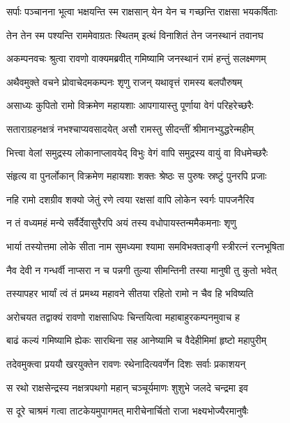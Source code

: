 \twolineshloka
{सर्पाः पञ्चानना भूत्वा भक्षयन्ति स्म राक्षसान्}
{येन येन च गच्छन्ति राक्षसा भयकर्षिताः} %

\twolineshloka
{तेन तेन स्म पश्यन्ति राममेवाग्रतः स्थितम्}
{इत्थं विनाशितं तेन जनस्थानं तवानघ} %

\twolineshloka
{अकम्पनवचः श्रुत्वा रावणो वाक्यमब्रवीत्}
{गमिष्यामि जनस्थानं रामं हन्तुं सलक्ष्मणम्} %

\twolineshloka
{अथैवमुक्ते वचने प्रोवाचेदमकम्पनः}
{शृणु राजन् यथावृत्तं रामस्य बलपौरुषम्} %

\twolineshloka
{असाध्यः कुपितो रामो विक्रमेण महायशाः}
{आपगायास्तु पूर्णाया वेगं परिहरेच्छरैः} %

\twolineshloka
{सताराग्रहनक्षत्रं नभश्चाप्यवसादयेत्}
{असौ रामस्तु सीदन्तीं श्रीमानभ्युद्धरेन्महीम्} %

\twolineshloka
{भित्त्वा वेलां समुद्रस्य लोकानाप्लावयेद् विभुः}
{वेगं वापि समुद्रस्य वायुं वा विधमेच्छरैः} %

\twolineshloka
{संहृत्य वा पुनर्लोकान् विक्रमेण महायशाः}
{शक्तः श्रेष्ठः स पुरुषः स्रष्टुं पुनरपि प्रजाः} %

\twolineshloka
{नहि रामो दशग्रीव शक्यो जेतुं रणे त्वया}
{रक्षसां वापि लोकेन स्वर्गः पापजनैरिव} %

\twolineshloka
{न तं वध्यमहं मन्ये सर्वैर्देवासुरैरपि}
{अयं तस्य वधोपायस्तन्ममैकमनाः शृणु} %

\twolineshloka
{भार्या तस्योत्तमा लोके सीता नाम सुमध्यमा}
{श्यामा समविभक्ताङ्गी स्त्रीरत्नं रत्नभूषिता} %

\twolineshloka
{नैव देवी न गन्धर्वी नाप्सरा न च पन्नगी}
{तुल्या सीमन्तिनी तस्या मानुषी तु कुतो भवेत्} %

\twolineshloka
{तस्यापहर भार्यां त्वं तं प्रमथ्य महावने}
{सीतया रहितो रामो न चैव हि भविष्यति} %

\twolineshloka
{अरोचयत तद्वाक्यं रावणो राक्षसाधिपः}
{चिन्तयित्वा महाबाहुरकम्पनमुवाच ह} %

\twolineshloka
{बाढं कल्यं गमिष्यामि ह्येकः सारथिना सह}
{आनेष्यामि च वैदेहीमिमां हृष्टो महापुरीम्} %

\twolineshloka
{तदेवमुक्त्वा प्रययौ खरयुक्तेन रावणः}
{रथेनादित्यवर्णेन दिशः सर्वाः प्रकाशयन्} %

\twolineshloka
{स रथो राक्षसेन्द्रस्य नक्षत्रपथगो महान्}
{चञ्चूर्यमाणः शुशुभे जलदे चन्द्रमा इव} %

\twolineshloka
{स दूरे चाश्रमं गत्वा ताटकेयमुपागमत्}
{मारीचेनार्चितो राजा भक्ष्यभोज्यैरमानुषैः} %

